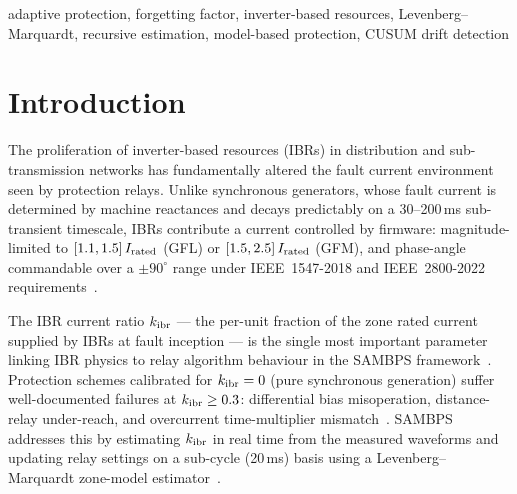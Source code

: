 \documentclass[journal]{IEEEtran}
\newcommand{\kibr}{k_{\rm ibr}}
\begin{document}
\begin{IEEEkeywords}
adaptive protection, forgetting factor, inverter-based resources,
Levenberg--Marquardt, recursive estimation, model-based protection,
CUSUM drift detection
\end{IEEEkeywords}

\section{Introduction}
\label{sec:intro}

The proliferation of inverter-based resources (IBRs) in distribution
and sub-transmission networks has fundamentally altered the fault
current environment seen by protection relays.  Unlike synchronous
generators, whose fault current is determined by machine reactances
and decays predictably on a 30--200\,ms sub-transient timescale,
IBRs contribute a current controlled by firmware: magnitude-limited
to $[1.1, 1.5]\,I_{\rm rated}$ (GFL) or $[1.5, 2.5]\,I_{\rm rated}$
(GFM), and phase-angle commandable over a $\pm 90^\circ$ range
under IEEE~1547-2018 and IEEE~2800-2022 requirements~\cite{IEEE1547,
IEEE2800}.

The IBR current ratio $\kibr$ — the per-unit fraction of the zone
rated current supplied by IBRs at fault inception — is the single
most important parameter linking IBR physics to relay algorithm
behaviour in the SAMBPS framework~\cite{SAMBP_TR68}.  Protection
schemes calibrated for $\kibr = 0$ (pure synchronous generation)
suffer well-documented failures at $\kibr \geq 0.3$: differential
bias misoperation, distance-relay under-reach, and overcurrent
time-multiplier mismatch~\cite{Telukunta2017,Plet2011}.  SAMBPS
addresses this by estimating $\kibr$ in real time from the measured
waveforms and updating relay settings on a sub-cycle (20\,ms) basis
using a Levenberg--Marquardt zone-model estimator~\cite{SAMBP_TR68}.
\end{document}
